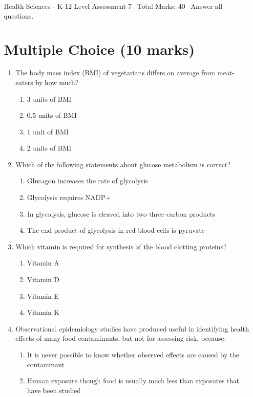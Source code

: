 \documentclass[12pt]{article}
\begin{document}
\begin{center}
Health Sciences - K-12 Level Assessment 7 \
Total Marks: 40 \
Answer all questions.
\end{center}

\section*{Multiple Choice (10 marks)}
\begin{enumerate}[label=\arabic*.]
\item The body mass index (BMI) of vegetarians differs on average from meat-eaters by how much?
\begin{enumerate}[label=(\alph*)]
    \item 3 units of BMI
    \item 0.5 units of BMI
    \item 1 unit of BMI
    \item 2 units of BMI
\end{enumerate}
\item Which of the following statements about glucose metabolism is correct?
\begin{enumerate}[label=(\alph*)]
    \item Glucagon increases the rate of glycolysis
    \item Glycolysis requires NADP+
    \item In glycolysis, glucose is cleaved into two three-carbon products
    \item The end-product of glycolysis in red blood cells is pyruvate
\end{enumerate}
\item Which vitamin is required for synthesis of the blood clotting proteins?
\begin{enumerate}[label=(\alph*)]
    \item Vitamin A
    \item Vitamin D
    \item Vitamin E
    \item Vitamin K
\end{enumerate}
\item Observational epidemiology studies have produced useful in identifying health effects of many food contaminants, but not for assessing risk, because:
\begin{enumerate}[label=(\alph*)]
    \item It is never possible to know whether observed effects are caused by the contaminant
    \item Human exposure though food is usually much less than exposures that have been studied

\end{enumerate}
\end{enumerate}
\end{document}
